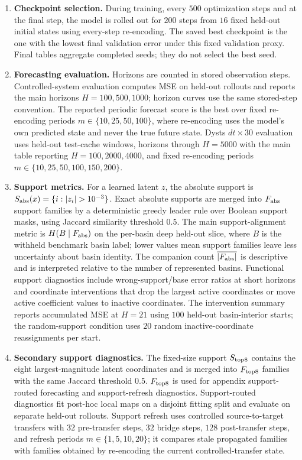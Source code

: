 \begin{enumerate}
  \item \textbf{Checkpoint selection.} During training, every \(500\) optimization steps and at the final step, the model is rolled out for \(200\) steps from \(16\) fixed held-out initial states using every-step re-encoding. The saved best checkpoint is the one with the lowest final validation error under this fixed validation proxy. Final tables aggregate completed seeds; they do not select the best seed.

  \item \textbf{Forecasting evaluation.} Horizons are counted in stored observation steps. Controlled-system evaluation computes MSE on held-out rollouts and reports the main horizons \(H=100,500,1000\); horizon curves use the same stored-step convention. The reported periodic forecast score is the best over fixed re-encoding periods \(m\in\{10,25,50,100\}\), where re-encoding uses the model's own predicted state and never the true future state. Dysts \(dt\times30\) evaluation uses held-out test-cache windows, horizons through \(H=5000\) with the main table reporting \(H=100,2000,4000\), and fixed re-encoding periods \(m\in\{10,25,50,100,150,200\}\).

  \item \textbf{Support metrics.} For a learned latent \(z\), the absolute support is \(S_{\rm abs}(x)=\{i: |z_i|>10^{-3}\}\). Exact absolute supports are merged into \(F_{\rm abs}\) support families by a deterministic greedy leader rule over Boolean support masks, using Jaccard similarity threshold \(0.5\). The main support-alignment metric is \(H(B\mid F_{\rm abs})\) on the per-basin deep held-out slice, where \(B\) is the withheld benchmark basin label; lower values mean support families leave less uncertainty about basin identity. The companion count \(\overline{|F_{\rm abs}|}\) is descriptive and is interpreted relative to the number of represented basins. Functional support diagnostics include wrong-support/base error ratios at short horizons and coordinate interventions that drop the largest active coordinates or move active coefficient values to inactive coordinates. The intervention summary reports accumulated MSE at \(H=21\) using \(100\) held-out basin-interior starts; the random-support condition uses \(20\) random inactive-coordinate reassignments per start.

  \item \textbf{Secondary support diagnostics.} The fixed-size support \(S_{\rm top8}\) contains the eight largest-magnitude latent coordinates and is merged into \(F_{\rm top8}\) families with the same Jaccard threshold \(0.5\). \(F_{\rm top8}\) is used for appendix support-routed forecasting and support-refresh diagnostics. Support-routed diagnostics fit post-hoc local maps on a disjoint fitting split and evaluate on separate held-out rollouts. Support refresh uses controlled source-to-target transfers with \(32\) pre-transfer steps, \(32\) bridge steps, \(128\) post-transfer steps, and refresh periods \(m\in\{1,5,10,20\}\); it compares stale propagated families with families obtained by re-encoding the current controlled-transfer state.


\end{enumerate}
